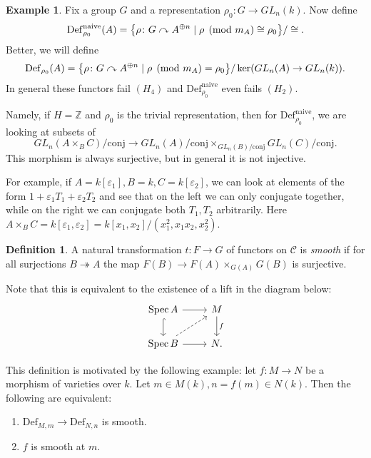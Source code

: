 \documentclass[leqno, openany]{memoir}
\theoremstyle{definition}
\newtheorem{defn}[thm]{Definition}
\newtheorem{exm}[thm]{Example}
\theoremstyle{remark}
\theoremstyle{plain}
\theoremstyle{definition}
\theoremstyle{remark}
\newcommand{\Z}{\mathbb{Z}}
\newcommand{\ep}{\varepsilon}
\newcommand{\mc}[1]{\mathcal{#1}}
\newcommand{\mr}[1]{\mathrm{#1}}
\DeclareMathOperator{\Spec}{Spec}
\begin{document}
\begin{exm}
    Fix a group $G$ and a representation $\rho_0 \colon G \to GL_n(k)$. Now define
    \[ \mr{Def}_{\rho_0}^{\text{naive}}(A) = \qty{\rho \colon G \curvearrowright A^{\oplus n} \mid \rho \pmod{m_A} \cong \rho_0} /\cong. \]
    Better, we will define
    \[ \mr{Def}_{\rho_0}(A) = \qty{\rho \colon G \curvearrowright A^{\oplus n} \mid \rho \pmod{m_A} = \rho_0} / \ker(GL_n(A) \to GL_n(k)). \]
    In general these functors fail $(H_4)$ and $\mr{Def}_{\rho_0}^{\text{naive}}$ even fails $(H_2)$.

    Namely, if $H = \Z$ and $\rho_0$ is the trivial representation, then for $\mr{Def}_{\rho_0}^{\text{naive}}$, we are looking at subsets of
    \[ GL_n(A \times_B C)/\text{conj} \to GL_n(A)/\text{conj} \times_{GL_n(B)/\text{conj}} GL_n(C)/\text{conj}. \]
    This morphism is always surjective, but in general it is not injective.

    For example, if $A = k[\ep_1], B = k, C = k[\ep_2]$, we can look at elements of the form $1 + \ep_1 T_1 + \ep_2 T_2$ and see that on the left we can only conjugate together, while on the right we can conjugate both $T_1, T_2$ arbitrarily. Here $A \times_B C = k[\ep_1, \ep_2] = k[x_1,x_2] / (x_1^2, x_1 x_2, x_2^2)$.
\end{exm}

\begin{defn}
    A natural transformation $t \colon F \to G$ of functors on $\mc{C}$ is \textit{smooth} if for all surjections $B \twoheadrightarrow A$ the map $F(B) \to F(A) \times_{G(A)} G(B)$ is surjective.
\end{defn}

Note that this is equivalent to the existence of a lift in the diagram below:
\begin{equation*}
\begin{tikzcd}
    \Spec A \ar{r} \ar[hookrightarrow]{d} & M \ar{d}{f} \\
    \Spec B \ar{r} \ar[dashrightarrow]{ur} & N.
\end{tikzcd}
\end{equation*}


This definition is motivated by the following example: let $f \colon M \to N$ be a morphism of varieties over $k$. Let $m \in M(k), n = f(m) \in N(k)$. Then the following are equivalent:
\begin{enumerate}
    \item $\mr{Def}_{M,m} \to \mr{Def}_{N,n}$ is smooth.
    \item $f$ is smooth at $m$.
\end{enumerate}
\end{document}
